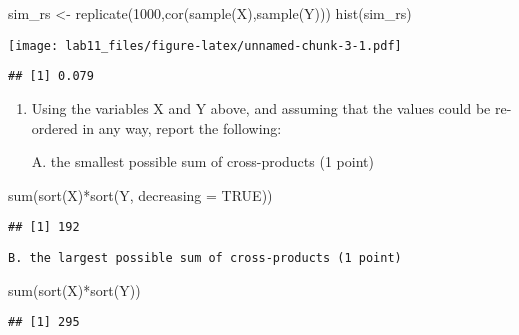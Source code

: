 \documentclass[
]{article}
\newenvironment{Shaded}{\begin{snugshade}}{\end{snugshade}}
\newcommand{\AttributeTok}[1]{\textcolor[rgb]{0.77,0.63,0.00}{#1}}
\newcommand{\ConstantTok}[1]{\textcolor[rgb]{0.00,0.00,0.00}{#1}}
\newcommand{\DecValTok}[1]{\textcolor[rgb]{0.00,0.00,0.81}{#1}}
\newcommand{\FunctionTok}[1]{\textcolor[rgb]{0.00,0.00,0.00}{#1}}
\newcommand{\NormalTok}[1]{#1}
\newcommand{\OtherTok}[1]{\textcolor[rgb]{0.56,0.35,0.01}{#1}}
\newcommand{\SpecialCharTok}[1]{\textcolor[rgb]{0.00,0.00,0.00}{#1}}
\begin{document}
\begin{Shaded}
\begin{Highlighting}[]
\NormalTok{sim\_rs }\OtherTok{\textless{}{-}} \FunctionTok{replicate}\NormalTok{(}\DecValTok{1000}\NormalTok{,}\FunctionTok{cor}\NormalTok{(}\FunctionTok{sample}\NormalTok{(X),}\FunctionTok{sample}\NormalTok{(Y)))}
    \FunctionTok{hist}\NormalTok{(sim\_rs)}
\end{Highlighting}
\end{Shaded}

\texttt{[image: lab11\_files/figure-latex/unnamed-chunk-3-1.pdf]}

\begin{Shaded}
\end{Shaded}

\begin{verbatim}
## [1] 0.079
\end{verbatim}

\begin{enumerate}
\def\labelenumi{\arabic{enumi}.}
\setcounter{enumi}{1}
\item
  Using the variables X and Y above, and assuming that the values could
  be re-ordered in any way, report the following:

  A. the smallest possible sum of cross-products (1 point)
\end{enumerate}

\begin{Shaded}
\begin{Highlighting}[]
\FunctionTok{sum}\NormalTok{(}\FunctionTok{sort}\NormalTok{(X)}\SpecialCharTok{*}\FunctionTok{sort}\NormalTok{(Y, }\AttributeTok{decreasing =} \ConstantTok{TRUE}\NormalTok{))}
\end{Highlighting}
\end{Shaded}

\begin{verbatim}
## [1] 192
\end{verbatim}

\begin{verbatim}
B. the largest possible sum of cross-products (1 point)
\end{verbatim}

\begin{Shaded}
\begin{Highlighting}[]
\FunctionTok{sum}\NormalTok{(}\FunctionTok{sort}\NormalTok{(X)}\SpecialCharTok{*}\FunctionTok{sort}\NormalTok{(Y))}
\end{Highlighting}
\end{Shaded}

\begin{verbatim}
## [1] 295
\end{verbatim}
\end{document}
